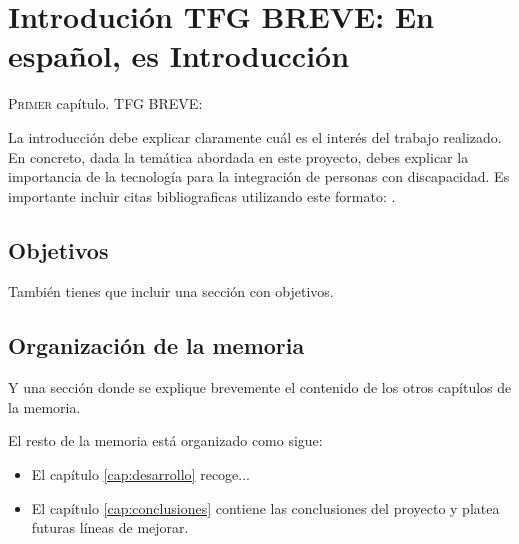 \chapter{Introdución TFG BREVE: En español, es Introducción }
\label{chap:introducion}

\lettrine{P}{rimer} capítulo.
TFG BREVE: 

La introducción debe explicar claramente cuál es el interés del trabajo realizado. En concreto, dada la temática abordada en este proyecto, debes explicar la importancia de la tecnología para la integración de personas con discapacidad. Es importante incluir citas bibliograficas utilizando este formato: \cite{ErlangBook,ErlangWebBook}. 

 \section{Objetivos}
También tienes que incluir una sección con objetivos.

\section{Organización de la memoria}
Y una sección donde se explique brevemente el contenido de los otros capítulos de la memoria. 

El resto de la memoria está organizado como sigue:
\begin{itemize}
\item El capítulo  \ref{cap:desarrollo} recoge...
\item El capítulo \ref{cap:conclusiones} contiene las conclusiones del proyecto y platea futuras líneas de mejorar.
\end{itemize}
